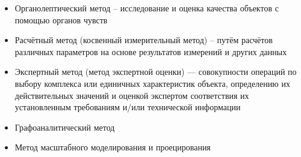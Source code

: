 \begin{itemize}
\item  Органолептический метод – исследование и оценка качества объектов с помощью органов чувств
\item Расчётный метод (косвенный измерительный метод) – путём расчётов различных параметров на основе результатов измерений и других данных
\item Экспертный метод (метод экспертной оценки) — совокупности операций по выбору комплекса или единичных характеристик объекта, определению их действительных значений и оценкой экспертом соответствия их установленным требованиям и/или технической информации
\item Графоаналитический метод  
\item Метод масштабного моделирования и проецирования
\end{itemize}
%
